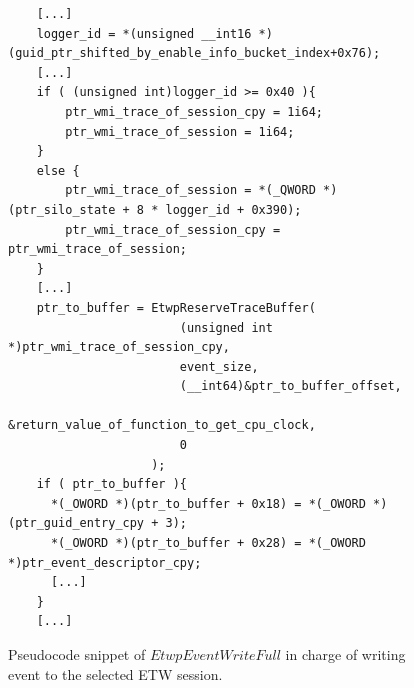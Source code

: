 \begin{figure}[H]
  \begin{lstlisting}
    [...]
    logger_id = *(unsigned __int16 *)(guid_ptr_shifted_by_enable_info_bucket_index+0x76);
    [...]
    if ( (unsigned int)logger_id >= 0x40 ){
        ptr_wmi_trace_of_session_cpy = 1i64;
        ptr_wmi_trace_of_session = 1i64;
    }
    else {
        ptr_wmi_trace_of_session = *(_QWORD *)(ptr_silo_state + 8 * logger_id + 0x390);
        ptr_wmi_trace_of_session_cpy = ptr_wmi_trace_of_session;
    }
    [...]
    ptr_to_buffer = EtwpReserveTraceBuffer(
                        (unsigned int *)ptr_wmi_trace_of_session_cpy,
                        event_size,
                        (__int64)&ptr_to_buffer_offset,
                        &return_value_of_function_to_get_cpu_clock,
                        0
                    );
    if ( ptr_to_buffer ){
      *(_OWORD *)(ptr_to_buffer + 0x18) = *(_OWORD *)(ptr_guid_entry_cpy + 3);
      *(_OWORD *)(ptr_to_buffer + 0x28) = *(_OWORD *)ptr_event_descriptor_cpy;
      [...]
    }
    [...]

  \end{lstlisting} 
  \caption[]{Pseudocode snippet of $EtwpEventWriteFull$ in charge of writing event to the selected ETW session.}
  \label{fig:exact_moment_of_writing_to_session}
\end{figure}

